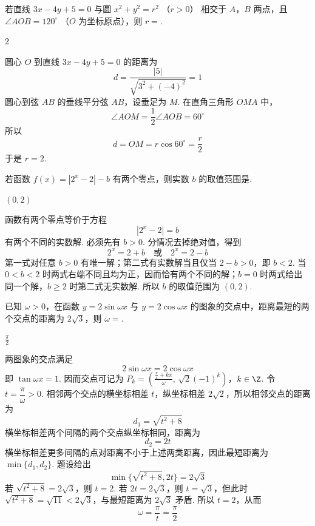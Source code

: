 \begin{problem}
若直线 \(3x - 4y + 5 = 0\) 与圆 \(x^{2} + y^{2} = r^{2}\) （\(r > 0\)） 相交于 \(A\)，\(B\) 两点，且 \(\angle AOB = 120^{\circ}\) （\(O\) 为坐标原点），则 \(r = \)\fillinblank{}.
\end{problem}

\begin{answer}
\(2\)
\end{answer}

\begin{solution}
圆心 \(O\) 到直线 \(3x-4y+5=0\) 的距离为
\[
d=\frac{|5|}{\sqrt{3^2+(-4)^2}}=1
\]
圆心到弦 \(AB\) 的垂线平分弦 \(AB\)，设垂足为 \(M\). 在直角三角形 \(OMA\) 中，
\[
\angle AOM=\frac12\angle AOB=60^{\circ}
\]
所以
\[
d=OM=r\cos60^{\circ}=\frac r2
\]
于是 \(r=2\).
\end{solution}

\begin{problem}
若函数 \( f(x) = |2^x - 2| - b \) 有两个零点，则实数 \( b \) 的取值范围是\fillinblank{}.
\end{problem}

\begin{answer}
\((0,2)\)
\end{answer}

\begin{solution}
函数有两个零点等价于方程
\[
|2^x-2|=b
\]
有两个不同的实数解. 必须先有 \(b>0\). 分情况去掉绝对值，得到
\[
2^x=2+b
\quad\text{或}\quad
2^x=2-b
\]
第一式对任意 \(b>0\) 有唯一解；第二式有实数解当且仅当 \(2-b>0\)，即 \(b<2\). 当 \(0<b<2\) 时两式右端不同且均为正，因而恰有两个不同的解；\(b=0\) 时两式给出同一个解，\(b\geqslant2\) 时第二式无实数解. 所以 \(b\) 的取值范围为 \((0,2)\).
\end{solution}

\begin{problem}
已知 \(\omega > 0\)，在函数 \(y = 2\sin \omega x\) 与 \(y = 2\cos \omega x\) 的图象的交点中，距离最短的两个交点的距离为 \(2\sqrt{3}\)，则 \(\omega = \)\fillinblank{}.
\end{problem}

\begin{answer}
\(\frac{\pi}{2}\)
\end{answer}

\begin{solution}
两图象的交点满足
\[
2\sin\omega x=2\cos\omega x
\]
即 \(\tan\omega x=1\). 因而交点可记为
\(P_k=\left(\frac{\frac{\pi}{4}+k\pi}{\omega},\,\sqrt2(-1)^k\right)\)，\(k\in\Z\).
令 \(t=\dfrac\pi\omega>0\). 相邻两个交点的横坐标相差 \(t\)，纵坐标相差 \(2\sqrt2\)，所以相邻交点的距离为
\[
d_1=\sqrt{t^2+8}
\]
横坐标相差两个间隔的两个交点纵坐标相同，距离为
\[
d_2=2t
\]
横坐标相差更多间隔的点对距离不小于上述两类距离，因此最短距离为 \(\min\{d_1,d_2\}\). 题设给出
\[
\min\{\sqrt{t^2+8},2t\}=2\sqrt3
\]
若 \(\sqrt{t^2+8}=2\sqrt3\)，则 \(t=2\). 若 \(2t=2\sqrt3\)，则 \(t=\sqrt3\)，但此时 \(\sqrt{t^2+8}=\sqrt{11}<2\sqrt3\)，与最短距离为 \(2\sqrt3\) 矛盾. 所以 \(t=2\)，从而
\[
\omega=\frac\pi t=\frac\pi2
\]
\end{solution}


